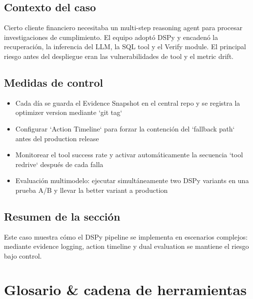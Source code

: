 \documentclass[a4paper]{article}
\begin{document}
\subsection{Contexto del caso}

Cierto cliente financiero necesitaba un multi-step reasoning agent para procesar investigaciones de cumplimiento. El equipo adoptó DSPy y encadenó la recuperación, la inferencia del LLM, la SQL tool y el Verify module. El principal riesgo antes del despliegue eran las vulnerabilidades de tool y el metric drift.

\subsection{Medidas de control}

\begin{itemize}
    \item Cada día se guarda el Evidence Snapshot en el central repo y se registra la optimizer version mediante `git tag`
    \item Configurar `Action Timeline` para forzar la contención del `fallback path` antes del production release
    \item Monitorear el tool success rate y activar automáticamente la secuencia `tool redrive` después de cada falla
    \item Evaluación multimodelo: ejecutar simultáneamente two DSPy variants en una prueba A/B y llevar la better variant a production
\end{itemize}

\subsection{Resumen de la sección}

Este caso muestra cómo el DSPy pipeline se implementa en escenarios complejos: mediante evidence logging, action timeline y dual evaluation se mantiene el riesgo bajo control.

\section{Glosario \& cadena de herramientas}
\end{document}
